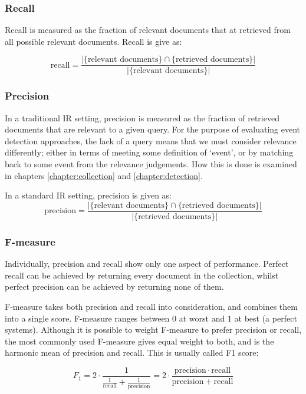 \subsubsection{Recall}

Recall is measured as the fraction of relevant documents that at retrieved from all possible relevant documents. Recall is give as:

\begin{equation}
	\text{recall}=\frac{|\{\text{relevant documents}\}\cap\{\text{retrieved documents}\}|}{|\{\text{relevant documents}\}|}
\end{equation}

\subsubsection{Precision}
In a traditional IR setting, precision is measured as the fraction of retrieved documents that are relevant to a given query.
For the purpose of evaluating event detection approaches, the lack of a query means that we must consider relevance differently; either in terms of meeting some definition of `event', or by matching back to some event from the relevance judgements.
How this is done is examined in chapters \ref{chapter:collection} and \ref{chapter:detection}.

In a standard IR setting, precision is given as:
\begin{equation}
	\text{precision}=\frac{|\{\text{relevant documents}\}\cap\{\text{retrieved documents}\}|}{|\{\text{retrieved documents}\}|}
\end{equation}

\subsubsection{F-measure}
Individually, precision and recall show only one aspect of performance.
Perfect recall can be achieved by returning every document in the collection,
whilst perfect precision can be achieved by returning none of them.

F-measure takes both precision and recall into consideration, and combines them into a single score. F-measure ranges between 0 at worst and 1 at best (a perfect systems). Although it is possible to weight F-measure to prefer precision or recall, the most commonly used F-measure gives equal weight to both, and is the harmonic mean of precision and recall. This is usually called F1 score:

\begin{equation}
	F_1 = 2 \cdot \frac{1}{\tfrac{1}{\mathrm{recall}} + \tfrac{1}{\mathrm{precision}}} = 2 \cdot \frac{\mathrm{precision} \cdot \mathrm{recall}}{\mathrm{precision} + \mathrm{recall}}
\end{equation}

